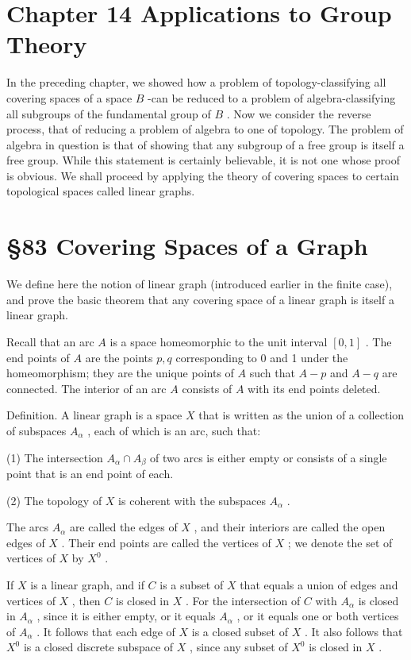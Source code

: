 \documentclass[10pt]{article}
\begin{document}
\section*{Chapter 14 Applications to Group Theory}

In the preceding chapter, we showed how a problem of topology-classifying all covering spaces of a space \(B\) -can be reduced to a problem of algebra-classifying all subgroups of the fundamental group of \(B\) . Now we consider the reverse process, that of reducing a problem of algebra to one of topology. The problem of algebra in question is that of showing that any subgroup of a free group is itself a free group. While this statement is certainly believable, it is not one whose proof is obvious. We shall proceed by applying the theory of covering spaces to certain topological spaces called linear graphs.

\section*{§83 Covering Spaces of a Graph}

We define here the notion of linear graph (introduced earlier in the finite case), and prove the basic theorem that any covering space of a linear graph is itself a linear graph.

Recall that an arc \(A\) is a space homeomorphic to the unit interval \(\left\lbrack  {0,1}\right\rbrack\) . The end points of \(A\) are the points \(p,q\) corresponding to 0 and 1 under the homeomorphism; they are the unique points of \(A\) such that \(A - p\) and \(A - q\) are connected. The interior of an arc \(A\) consists of \(A\) with its end points deleted.

Definition. A linear graph is a space \(X\) that is written as the union of a collection of subspaces \({A}_{\alpha }\) , each of which is an arc, such that:

(1) The intersection \({A}_{\alpha } \cap  {A}_{\beta }\) of two arcs is either empty or consists of a single point that is an end point of each.

(2) The topology of \(X\) is coherent with the subspaces \({A}_{\alpha }\) .

The arcs \({A}_{\alpha }\) are called the edges of \(X\) , and their interiors are called the open edges of \(X\) . Their end points are called the vertices of \(X\) ; we denote the set of vertices of \(X\) by \({X}^{0}\) .

If \(X\) is a linear graph, and if \(C\) is a subset of \(X\) that equals a union of edges and vertices of \(X\) , then \(C\) is closed in \(X\) . For the intersection of \(C\) with \({A}_{\alpha }\) is closed in \({A}_{\alpha }\) , since it is either empty, or it equals \({A}_{\alpha }\) , or it equals one or both vertices of \({A}_{\alpha }\) . It follows that each edge of \(X\) is a closed subset of \(X\) . It also follows that \({X}^{0}\) is a closed discrete subspace of \(X\) , since any subset of \({X}^{0}\) is closed in \(X\) .
\end{document}
